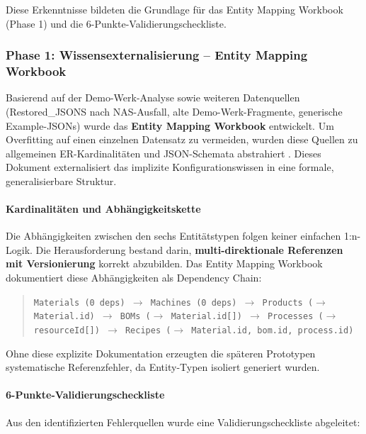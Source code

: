 Diese Erkenntnisse bildeten die Grundlage für das Entity Mapping Workbook (Phase 1) und die 6-Punkte-Validierungscheckliste.


\subsubsection{Phase 1: Wissensexternalisierung -- Entity Mapping Workbook}
\label{subsubsec:Phase1}

Basierend auf der Demo-Werk-Analyse sowie weiteren Datenquellen (Restored\_JSONS nach NAS-Ausfall, alte Demo-Werk-Fragmente, generische Example-JSONs) wurde das \textbf{Entity Mapping Workbook} entwickelt. Um Overfitting auf einen einzelnen Datensatz zu vermeiden, wurden diese Quellen zu allgemeinen ER-Kardinalitäten und JSON-Schemata abstrahiert \citep{mayring:qualitative2015}. Dieses Dokument externalisiert das implizite Konfigurationswissen in eine formale, generalisierbare Struktur.

\paragraph{Kardinalitäten und Abhängigkeitskette}

Die Abhängigkeiten zwischen den sechs Entitätstypen folgen keiner einfachen 1:n-Logik. Die Herausforderung bestand darin, \textbf{multi-direktionale Referenzen mit Versionierung} korrekt abzubilden. Das Entity Mapping Workbook dokumentiert diese Abhängigkeiten als Dependency Chain:

\begin{quote}
\small
\texttt{Materials (0 deps) $\rightarrow$ Machines (0 deps) $\rightarrow$ Products ($\rightarrow$ Material.id) $\rightarrow$ BOMs ($\rightarrow$ Material.id[]) $\rightarrow$ Processes ($\rightarrow$ resourceId[]) $\rightarrow$ Recipes ($\rightarrow$ Material.id, bom.id, process.id)}
\end{quote}

Ohne diese explizite Dokumentation erzeugten die späteren Prototypen systematische Referenzfehler, da Entity-Typen isoliert generiert wurden.

\paragraph{6-Punkte-Validierungscheckliste}

Aus den identifizierten Fehlerquellen wurde eine Validierungscheckliste abgeleitet:

